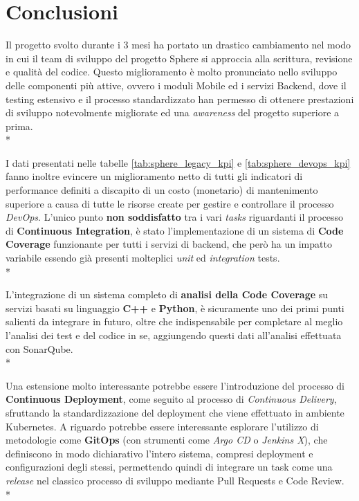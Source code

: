 \documentclass[../main.tex]{subfiles}
\begin{document}
    
    \chapter*{Conclusioni}
	
	    Il progetto svolto durante i 3 mesi ha portato un drastico cambiamento nel modo in cui il team di sviluppo del progetto Sphere si approccia alla scrittura, revisione e qualità del codice. Questo miglioramento è molto pronunciato nello sviluppo delle componenti più attive, ovvero i moduli Mobile ed i servizi Backend, dove il testing estensivo e il processo standardizzato han permesso di ottenere prestazioni di sviluppo notevolmente migliorate ed una \emph{awareness} del progetto superiore a prima.\\*
        
        I dati presentati nelle tabelle \ref{tab:sphere_legacy_kpi} e \ref{tab:sphere_devops_kpi} fanno inoltre evincere un miglioramento netto di tutti gli indicatori di performance definiti a discapito di un costo (monetario) di mantenimento superiore a causa di tutte le risorse create per gestire e controllare il processo \emph{DevOps}. L'unico punto \textbf{non soddisfatto} tra i vari \emph{tasks} riguardanti il processo di \textbf{Continuous Integration}, è stato l'implementazione di un sistema di \textbf{Code Coverage} funzionante per tutti i servizi di backend, che però ha un impatto variabile essendo già presenti molteplici \emph{unit} ed \emph{integration} tests.\\*
	
	    L'integrazione di un sistema completo di \textbf{analisi della Code Coverage} su servizi basati su linguaggio \textbf{C++} e \textbf{Python}, è sicuramente uno dei primi punti salienti da integrare in futuro, oltre che indispensabile per completare al meglio l'analisi dei test e del codice in se, aggiungendo questi dati all'analisi effettuata con SonarQube.\\*
	    
	    Una estensione molto interessante potrebbe essere l'introduzione del processo di \textbf{Continuous Deployment}, come seguito al processo di \emph{Continuous Delivery}, sfruttando la standardizzazione del deployment che viene effettuato in ambiente Kubernetes. A riguardo potrebbe essere interessante esplorare l'utilizzo di metodologie come \textbf{GitOps}\cite{gitops} (con strumenti come \emph{Argo CD} o \emph{Jenkins X}), che definiscono in modo dichiarativo l'intero sistema, compresi deployment e configurazioni degli stessi, permettendo quindi di integrare un task come una \emph{release} nel classico processo di sviluppo mediante Pull Requests e Code Review.\\*
	
\end{document}
